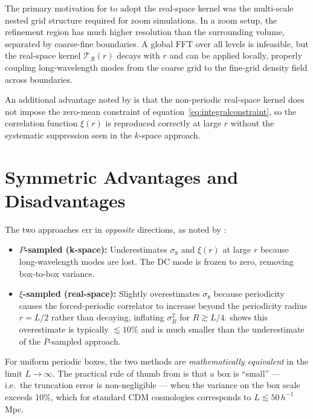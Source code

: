 \documentclass[12pt]{article}
\begin{document}
The primary motivation for \citet{Hahn2011} to adopt the real-space
kernel was the multi-scale nested grid structure required for zoom
simulations.  In a zoom setup, the refinement region has much higher
resolution than the surrounding volume, separated by coarse-fine
boundaries.  A global FFT over all levels is infeasible, but the
real-space kernel $\mathcal{T}_\mathcal{R}(r)$ decays with $r$ and can
be applied locally, properly coupling long-wavelength modes from the
coarse grid to the fine-grid density field across boundaries.

An additional advantage noted by \citet{Hahn2011} is that the
non-periodic real-space kernel does not impose the zero-mean constraint
of equation~\eqref{eq:integralconstraint}, so the correlation function
$\xi(r)$ is reproduced correctly at large $r$ without the systematic
suppression seen in the $k$-space approach.

\section{Symmetric Advantages and Disadvantages}
\label{sec:comparison}

The two approaches err in \emph{opposite} directions, as noted by
\citet{Pen1997}:
%
\begin{itemize}
  \item \textbf{$P$-sampled (k-space):} Underestimates $\sigma_8$ and
        $\xi(r)$ at large $r$ because long-wavelength modes are lost.
        The DC mode is frozen to zero, removing box-to-box variance.
  \item \textbf{$\xi$-sampled (real-space):} Slightly overestimates
        $\sigma_8$ because periodicity causes the forced-periodic
        correlator to increase beyond the periodicity radius $r = L/2$
        rather than decaying, inflating $\sigma_R^2$ for $R \gtrsim L/4$.
        \citet{Pen1997} shows this overestimate is typically $\lesssim
        10\%$ and is much smaller than the underestimate of the $P$-sampled
        approach.
\end{itemize}

For uniform periodic boxes, the two methods are \emph{mathematically
equivalent} in the limit $L \to \infty$.  The practical rule of thumb
from \citet{Pen1997} is that a box is ``small'' --- i.e.\ the truncation
error is non-negligible --- when the variance on the box scale exceeds
10\%, which for standard CDM cosmologies corresponds to $L \lesssim 50\,
h^{-1}$\,Mpc.
\end{document}
